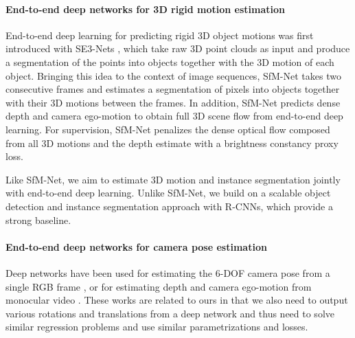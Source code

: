 \paragraph{End-to-end deep networks for 3D rigid motion estimation}
End-to-end deep learning for predicting rigid 3D object motions was first introduced with
SE3-Nets \cite{SE3Nets}, which take raw 3D point clouds as input and produce a segmentation
of the points into objects together with the 3D motion of each object.
Bringing this idea to the context of image sequences, SfM-Net \cite{SfmNet} takes two consecutive frames and
estimates a segmentation of pixels into objects together with their 3D motions between the frames.
In addition, SfM-Net predicts dense depth and camera ego-motion to obtain full 3D scene flow from end-to-end deep learning.
For supervision, SfM-Net penalizes the dense optical flow composed from all 3D motions and the depth estimate
with a brightness constancy proxy loss.

Like SfM-Net, we aim to estimate 3D motion and instance segmentation jointly with
end-to-end deep learning.
Unlike SfM-Net, we build on a scalable object detection and instance segmentation
approach with R-CNNs, which provide a strong baseline.

\paragraph{End-to-end deep networks for camera pose estimation}
Deep networks have been used for estimating the 6-DOF camera pose from
a single RGB frame \cite{PoseNet, PoseNet2}, or for estimating depth and camera ego-motion
from monocular video \cite{UnsupPoseDepth}.
These works are related to
ours in that we also need to output various rotations and translations from a deep network
and thus need to solve similar regression problems and use similar parametrizations
and losses.


